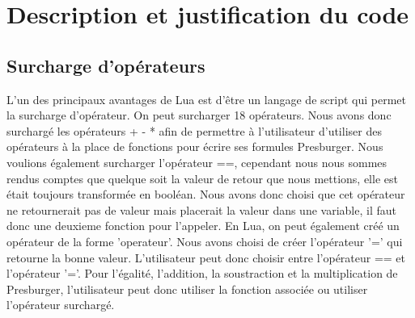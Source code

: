 \documentclass{article}%
\begin{document}

\section{Description et justification du code}

\subsection{Surcharge d'opérateurs}


L'un des principaux avantages de Lua est d'être un langage de script qui permet la surcharge d'opérateur. On peut surcharger 18 opérateurs. Nous avons donc surchargé les opérateurs + - * afin de permettre à l'utilisateur d'utiliser des opérateurs à la place de fonctions pour écrire ses formules Presburger.
Nous voulions également surcharger l'opérateur ==, cependant nous nous sommes rendus comptes que quelque soit la valeur de retour que nous mettions, elle est était toujours transformée en booléan.
Nous avons donc choisi que cet opérateur ne retournerait pas de valeur mais placerait la valeur dans une variable, il faut donc une deuxieme fonction pour l'appeler.
En Lua, on peut également créé un opérateur de la forme 'operateur'. Nous avons choisi de créer l'opérateur '=' qui retourne la bonne valeur.
L'utilisateur peut donc choisir entre l'opérateur == et l'opérateur '='.
Pour l'égalité, l'addition, la soustraction et la multiplication de Presburger, l'utilisateur peut donc utiliser la fonction associée ou utiliser l'opérateur surchargé.
\end{document}
